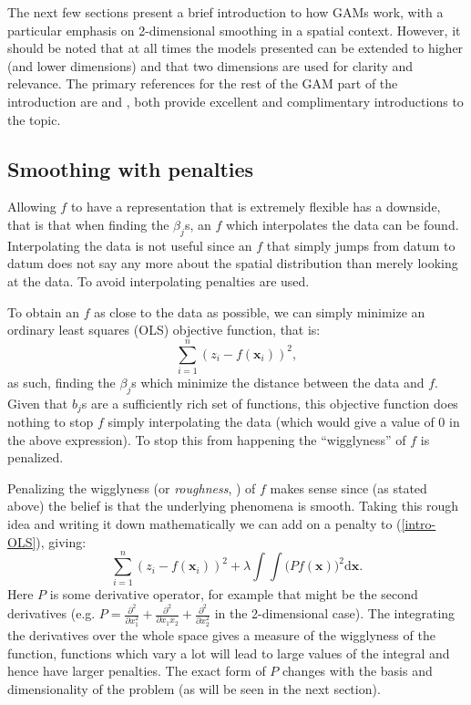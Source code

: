 The next few sections present a brief introduction to how GAMs work, with a particular emphasis on 2-dimensional smoothing in a spatial context. However, it should be noted that at all times the models presented can be extended to higher (and lower dimensions) and that two dimensions are used for clarity and relevance. The primary references for the rest of the GAM part of the introduction are  and , both provide excellent and complimentary introductions to the topic.

\subsection{Smoothing with penalties}
\label{GAMpenalties}

Allowing $f$ to have a representation that is extremely flexible has a downside, that is that when finding the $\beta_j$s, an $f$ which interpolates the data can be found. Interpolating the data is not useful since an $f$ that simply jumps from datum to datum does not say any more about the spatial distribution than merely looking at the data. To avoid interpolating penalties are used.

To obtain an $f$ as close to the data as possible, we can simply minimize an ordinary least squares (OLS) objective function, that is:
\begin{equation}
\sum_{i=1}^n (z_i - f(\mathbf{x}_i))^2,
\label{intro-OLS}
\end{equation}
as such, finding the $\beta_j$s which minimize the distance between the data and $f$. Given that $b_j$s are a sufficiently rich set of functions, this objective function does nothing to stop $f$ simply interpolating the data (which would give a value of 0 in the above expression). To stop this from happening the ``wigglyness'' of $f$ is penalized.

Penalizing the wigglyness (or \textit{roughness}, \cite{rwc}) of $f$ makes sense since (as stated above) the belief is that the underlying phenomena is smooth. Taking this rough idea and writing it down mathematically we can add on a penalty to (\ref{intro-OLS}), giving:
\begin{equation}
\sum_{i=1}^n (z_i - f(\mathbf{x}_i))^2 +  \lambda \int\int \Big(P f(\mathbf{x})\Big)^2 \text{d}\mathbf{x}.
\label{intro-2d-objfcn}
\end{equation}
Here $P$ is some derivative operator, for example that might be the second derivatives (e.g. $P=\frac{\partial^2}{\partial x_1^2} + \frac{\partial^2}{\partial x_1 x_2} + \frac{\partial^2}{\partial x_2^2}$ in the 2-dimensional case). The integrating the derivatives over the whole space gives a measure of the wigglyness of the function, functions which vary a lot will lead to large values of the integral and hence have larger penalties. The exact form of $P$ changes with the basis and dimensionality of the problem (as will be seen in the next section).

